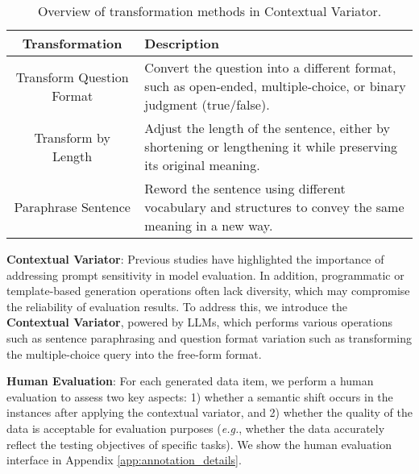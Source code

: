 \begin{table}[h]
    \centering
    \small
    \caption{Overview of transformation methods in Contextual Variator.}
    \renewcommand{\arraystretch}{1.2}
    \label{tab:diversity_enhancer}
    \begin{tabular}{cp{11.8cm}}
    \toprule[1pt]
        \textbf{Transformation} & \textbf{Description} \\
        \midrule
        Transform Question Format & Convert the question into a different format, such as open-ended, multiple-choice, or binary judgment (true/false). \\
        Transform by Length & Adjust the length of the sentence, either by shortening or lengthening it while preserving its original meaning. \\
        Paraphrase Sentence  & Reword the sentence using different vocabulary and structures to convey the same meaning in a new way. \\
        \bottomrule[1pt]
    \end{tabular}
    \vspace{-10pt}
\end{table}

\textbf{Contextual Variator}: Previous studies \cite{huang2024position, sclar2023quantifying,wang2024template} have highlighted the importance of addressing prompt sensitivity in model evaluation. In addition, programmatic or template-based generation operations often lack diversity, which may compromise the reliability of evaluation results. To address this, we introduce the \textbf{Contextual Variator}, powered by LLMs, which performs various operations such as sentence paraphrasing and question format variation such as transforming the multiple-choice query into the free-form format.


\textbf{Human Evaluation}: For each generated data item, we perform a human evaluation to assess two key aspects: 1) whether a semantic shift occurs in the instances after applying the contextual variator, and 2) whether the quality of the data is acceptable for evaluation purposes (\emph{e.g.}, whether the data accurately reflect the testing objectives of specific tasks). We show the human evaluation interface in Appendix \ref{app:annotation_details}.



